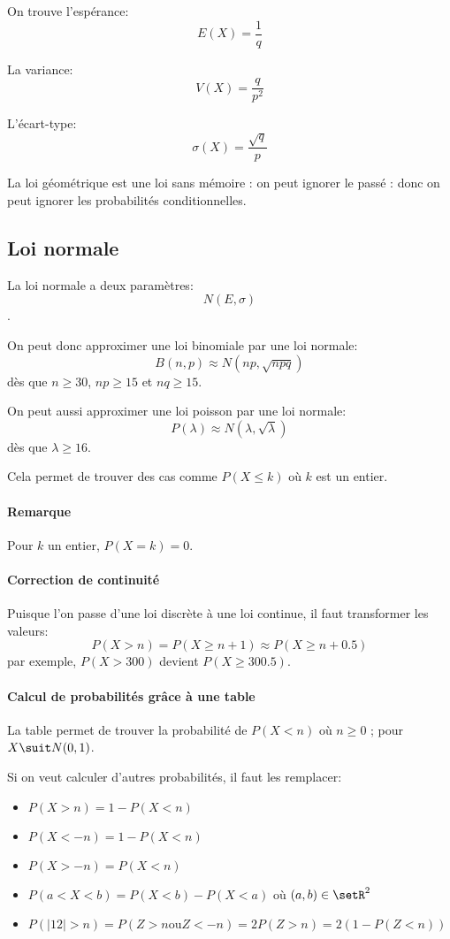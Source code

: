 \documentclass[10pt,a4paper,french]{article}
\begin{document}
On trouve l'espérance: \[E(X) = \frac{1}{q}\]

La variance: \[V(X) = \frac{q}{p^2}\]

L'écart-type: \[\sigma(X) = \frac{\sqrt{q}}{p}\]

La loi géométrique est une loi sans mémoire : on peut ignorer le passé : donc on peut ignorer les probabilités conditionnelles.

\subsection{Loi normale}

La loi normale a deux paramètres: \[N(E, \sigma)\].

On peut donc approximer une loi binomiale par une loi normale: \[ B(n, p) \approx N(np, \sqrt{npq}) \] dès que $n \geq 30$, $np \geq 15$ et $nq \geq 15$.

On peut aussi approximer une loi poisson par une loi normale: \[P(\lambda) \approx N(\lambda, \sqrt{\lambda})\] dès que $\lambda \geq 16$.

Cela permet de trouver des cas comme $P(X \leq k)$ où $k$ est un entier.

\paragraph{Remarque}
Pour $k$ un entier, $P(X = k) = 0$.

\paragraph{Correction de continuité}
Puisque l'on passe d'une loi discrète à une loi continue, il faut transformer les valeurs: \[ P(X > n) = P(X \geq n+1) \approx P(X \geq n+0.5) \]
par exemple, $P(X > 300)$ devient $P(X \geq 300.5)$.

\paragraph{Calcul de probabilités grâce à une table}

La table permet de trouver la probabilité de $P(X < n)$ où $n \geq 0$ ; pour $X \suit N(0, 1)$.

Si on veut calculer d'autres probabilités, il faut les remplacer:
\begin{itemize}
\item $P(X > n) = 1 - P(X < n)$
\item $P(X < -n) = 1 - P(X < n)$
\item $P(X > -n) = P(X < n)$
\item $P(a < X < b) = P(X < b) - P(X < a)$ où $(a,b) \in \setR^2$
\item $P(\vert 12 \vert > n) = P(Z > n \text{ou} Z < -n) = 2 P(Z > n) = 2 (1-P(Z < n))$
\end{itemize}
\end{document}
